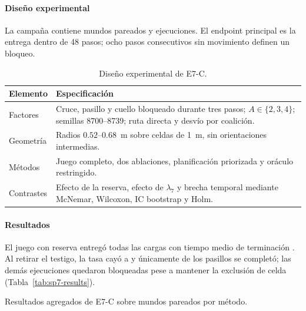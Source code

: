 \paragraph{Diseño experimental}


La campaña contiene \SPSevenWorlds{} mundos pareados y \SPSevenRuns{} ejecuciones. El endpoint principal es la entrega dentro de 48 pasos; ocho pasos consecutivos sin movimiento definen un bloqueo.

\begin{table}[!htbp]
  \centering
  \caption{Diseño experimental de E7-C.}
  \label{tab:sp7-design}
  \viutablefont
  \begin{tabularx}{0.94\textwidth}{>{\raggedright\arraybackslash}p{2.4cm} Y}
    \toprule
    Elemento & Especificación \\
    \midrule
    Factores & Cruce, pasillo y cuello bloqueado durante tres pasos; $A\in\{2,3,4\}$; semillas 8700--8739; ruta directa y desvío por coalición. \\
    Geometría & Radios $0.52$--$0.68$~m sobre celdas de 1~m, sin orientaciones intermedias. \\
    Métodos & Juego completo, dos ablaciones, planificación priorizada y oráculo restringido. \\
    Contrastes & Efecto de la reserva, efecto de $\lambda_7$ y brecha temporal mediante McNemar, Wilcoxon, IC \mbox{bootstrap} y Holm. \\
    \bottomrule
  \end{tabularx}
\end{table}

\paragraph{Resultados}

El juego con reserva entregó todas las cargas con tiempo medio de terminación \SPSevenProposedMakespan{}. Al retirar el testigo, la tasa cayó a \SPSevenNoReservationSuccess{} y únicamente \SPSevenCorridorNoReservationSuccess{} de los pasillos se completó; las demás ejecuciones quedaron bloqueadas pese a mantener la exclusión de celda (Tabla~\ref{tab:sp7-results}).

\begin{table}[!htbp]
  \centering
  \caption[Resultados agregados de E7-C sobre 360 mundos pareados por método.]{Resultados agregados de E7-C sobre \SPSevenWorlds{} mundos pareados por método.}
  \label{tab:sp7-results}
  \scriptsize
  \resizebox{\textwidth}{!}{}
  \viuownsource
\end{table}

